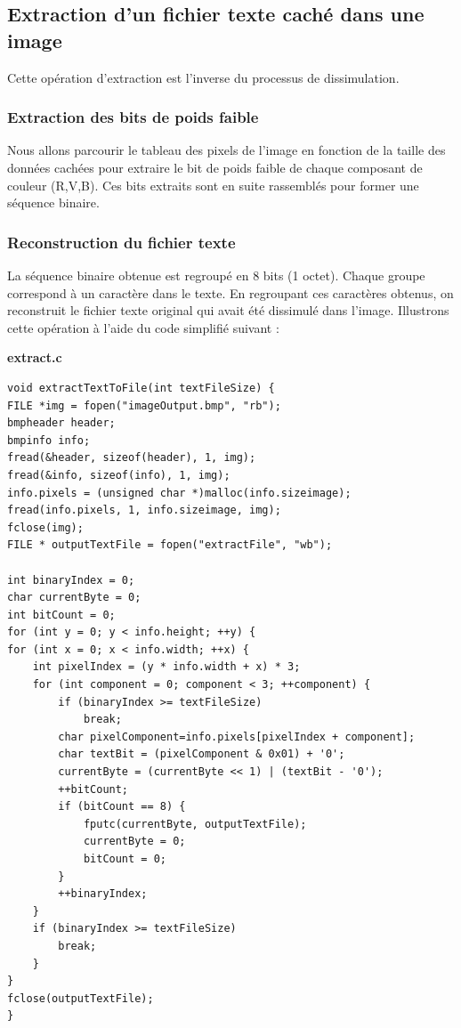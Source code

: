 \documentclass{article}
\begin{document}
\subsection{Extraction d'un fichier texte caché dans une image}
Cette opération d'extraction est l'inverse du processus de dissimulation.
\subsubsection{Extraction des bits de poids faible}
Nous allons parcourir le tableau des pixels de l'image en fonction de la taille des données cachées pour extraire le bit de poids faible de chaque composant de couleur (R,V,B). Ces bits extraits sont en suite rassemblés pour former une séquence binaire.
\subsubsection{Reconstruction du fichier texte}
La séquence binaire obtenue est regroupé en 8 bits (1 octet). Chaque groupe correspond à un caractère dans le texte. En regroupant ces caractères obtenus, on reconstruit le fichier texte original qui avait été dissimulé dans l'image. Illustrons cette opération à l'aide du code simplifié suivant :
\newpage
\begin{center}
    \textbf{extract.c}
\end{center}
\begin{framed}
\begin{verbatim}
void extractTextToFile(int textFileSize) {
FILE *img = fopen("imageOutput.bmp", "rb");
bmpheader header;
bmpinfo info;
fread(&header, sizeof(header), 1, img);
fread(&info, sizeof(info), 1, img);
info.pixels = (unsigned char *)malloc(info.sizeimage);
fread(info.pixels, 1, info.sizeimage, img);
fclose(img);
FILE * outputTextFile = fopen("extractFile", "wb");

int binaryIndex = 0;
char currentByte = 0;
int bitCount = 0;
for (int y = 0; y < info.height; ++y) {
for (int x = 0; x < info.width; ++x) {
    int pixelIndex = (y * info.width + x) * 3;
    for (int component = 0; component < 3; ++component) {
        if (binaryIndex >= textFileSize)
            break;
        char pixelComponent=info.pixels[pixelIndex + component];
        char textBit = (pixelComponent & 0x01) + '0';
        currentByte = (currentByte << 1) | (textBit - '0');
        ++bitCount;
        if (bitCount == 8) {
            fputc(currentByte, outputTextFile);
            currentByte = 0;
            bitCount = 0;
        }
        ++binaryIndex;
    }
    if (binaryIndex >= textFileSize)
        break;
    }
}
fclose(outputTextFile);
}
\end{verbatim}
\end{framed}
\end{document}
